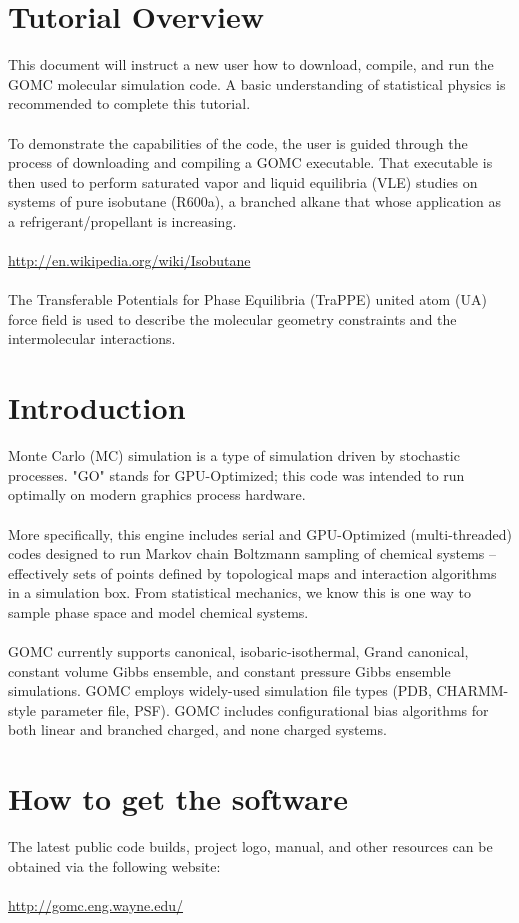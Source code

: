 \section{Tutorial Overview}
This document will instruct a new user how to download, compile, and run the GOMC molecular simulation code.  A basic understanding of statistical physics is recommended to complete this tutorial.\\\\
To demonstrate the capabilities of the code, the user is guided through the process of downloading and compiling a GOMC executable.  That executable is then used to perform saturated vapor and liquid equilibria (VLE) studies on systems of pure isobutane (R600a), a branched alkane that whose application as a refrigerant/propellant is increasing.\\\\
\url{http://en.wikipedia.org/wiki/Isobutane}\\\\
The Transferable Potentials for Phase Equilibria (TraPPE) united atom (UA) force field is used to describe the molecular geometry constraints and the intermolecular interactions.

\section{Introduction}
Monte Carlo (MC) simulation is a type of simulation driven by stochastic processes.  "GO" stands for GPU-Optimized; this code was intended to run optimally on modern graphics process hardware.\\\\
More specifically, this engine includes serial and GPU-Optimized (multi-threaded) codes designed to run Markov chain Boltzmann sampling of chemical systems -- effectively sets of points defined by topological maps and interaction algorithms in a simulation box.  From statistical mechanics, we know this is one way to sample phase space and model chemical systems.\\\\
GOMC currently supports canonical, isobaric-isothermal, Grand canonical, constant volume Gibbs ensemble, and constant pressure Gibbs ensemble simulations.  GOMC employs widely-used simulation file types (PDB, CHARMM-style parameter file, PSF).  GOMC includes configurational bias algorithms for both linear and branched charged, and none charged systems. 

\section{How to get the software}
The latest public code builds, project logo, manual, and other resources can be obtained via the following website:\\\\
\url{http://gomc.eng.wayne.edu/}

